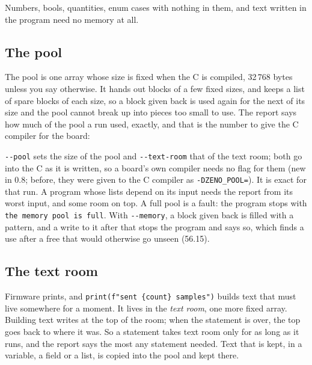 Numbers, bools, quantities, enum cases with nothing in them, and text
written in the program need no memory at all.

\subsection{The pool}

The pool is one array whose size is fixed when the C is compiled,
32\,768 bytes unless you say otherwise. It hands out blocks of a few
fixed sizes, and keeps a list of spare blocks of each size, so a block
given back is used again for the next of its size and the pool cannot
break up into pieces too small to use. The report says how much of the
pool a run used, exactly, and that is the number to give the C
compiler for the board:


\verb|--pool| sets the size of the pool and \verb|--text-room| that of
the text room; both go into the C as it is written, so a board's own
compiler needs no flag for them (new in 0.8; before, they were given to
the C compiler as \verb|-DZENO_POOL=|). It is exact for that run. A
program whose lists depend on its input needs the report from its
worst input, and some room on top. A full pool is a fault: the program
stops with \verb|the memory pool is full|. With \verb|--memory|, a
block given back is filled with a pattern, and a write to it after
that stops the program and says so, which finds a use after a free
that would otherwise go unseen (56.15).

\subsection{The text room}

Firmware prints, and \verb|print(f"sent {count} samples")| builds text
that must live somewhere for a moment. It lives in the \emph{text
room}, one more fixed array. Building text writes at the top of the
room; when the statement is over, the top goes back to where it was.
So a statement takes text room only for as long as it runs, and the
report says the most any statement needed. Text that is kept, in a
variable, a field or a list, is copied into the pool and kept there.

